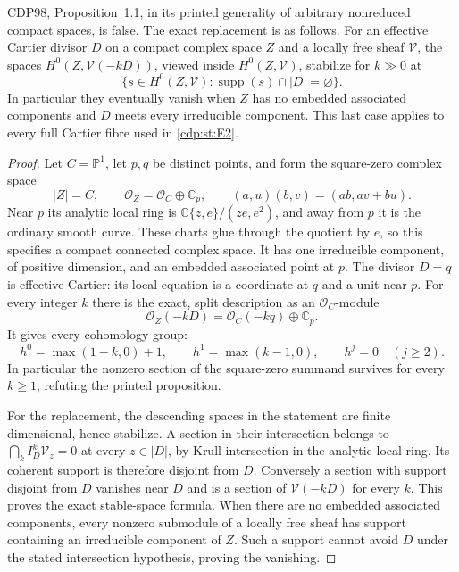 
\begin{proposition}\label{cdp:st:E17}
CDP98, Proposition~1.1, in its printed generality of arbitrary
nonreduced compact spaces, is false. The exact replacement is as
follows. For an effective Cartier divisor $D$ on a compact complex
space $Z$ and a locally free sheaf $\mathcal V$, the spaces
$H^0(Z,\mathcal V(-kD))$, viewed inside $H^0(Z,\mathcal V)$,
stabilize for $k\gg0$ at
\[
 \{s\in H^0(Z,\mathcal V):\operatorname{supp}(s)\cap|D|
       =\varnothing\}.
\]
In particular they eventually vanish when $Z$ has no embedded
associated components and $D$ meets every irreducible component.
This last case applies to every full Cartier fibre used in \ref{cdp:st:E2}.
\end{proposition}
\begin{proof}
Let $C=\mathbb P^1$, let $p,q$ be distinct points, and form the
square-zero complex space
\[
 |Z|=C,\qquad\mathcal O_Z=\mathcal O_C\oplus\mathbb C_p,
 \qquad(a,u)(b,v)=(ab,av+bu).
\]
Near $p$ its analytic local ring is
$\mathbb C\{z,e\}/(ze,e^2)$, and away from $p$ it is the
ordinary smooth curve. These charts glue through the quotient
by $e$, so this specifies a compact connected complex space.
It has one irreducible component, of positive dimension, and an
embedded associated point at $p$. The divisor $D=q$ is effective
Cartier: its local equation is a coordinate at $q$ and a unit
near $p$. For every integer $k$ there is the exact, split
description as an $\mathcal O_C$-module
\[
 \mathcal O_Z(-kD)=\mathcal O_C(-kq)\oplus\mathbb C_p.
\]
It gives every cohomology group:
\[
 h^0=\max(1-k,0)+1,\qquad h^1=\max(k-1,0),\qquad
 h^j=0\quad(j\geq2).
\]
In particular the nonzero section of the square-zero summand
survives for every $k\geq1$, refuting the printed proposition.

For the replacement, the descending spaces in the statement are
finite dimensional, hence stabilize. A section in their
intersection belongs to $\bigcap_k I_D^k\mathcal V_z=0$ at
every $z\in|D|$, by Krull intersection in the analytic local
ring. Its coherent support is therefore disjoint from $D$.
Conversely a section with support disjoint from $D$ vanishes
near $D$ and is a section of $\mathcal V(-kD)$ for every $k$.
This proves the exact stable-space formula. When there are no
embedded associated components, every nonzero submodule of a
locally free sheaf has support containing an irreducible
component of $Z$. Such a support cannot avoid $D$ under the
stated intersection hypothesis, proving the vanishing.
\end{proof}

